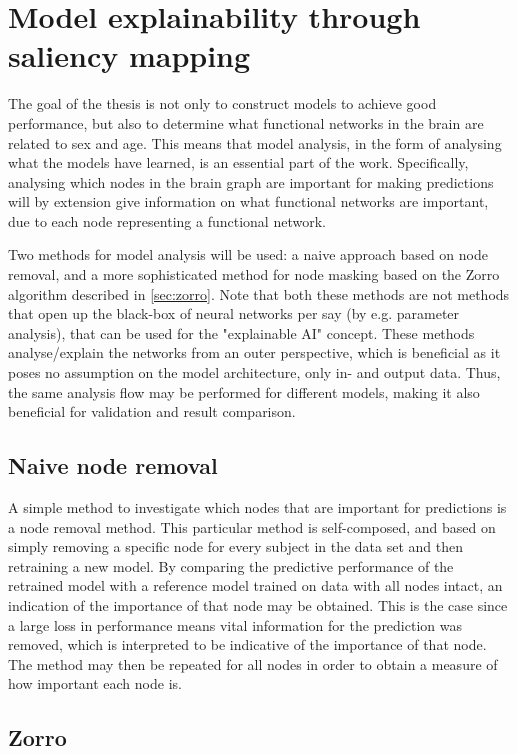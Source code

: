 \section{Model explainability through saliency mapping}
The goal of the thesis is not only to construct models to achieve good performance, but also to determine what functional networks in the brain are related to sex and age. This means that model analysis, in the form of analysing what the models have learned, is an essential part of the work. Specifically, analysing which nodes in the brain graph are important for making predictions will by extension give information on what functional networks are important, due to each node representing a functional network. 

Two methods for model analysis will be used: a naive approach based on node removal, and a more sophisticated method for node masking based on the Zorro algorithm described in \cref{sec:zorro}. Note that both these methods are not methods that open up the black-box of neural networks per say (by e.g. parameter analysis), that can be used for the "explainable AI" concept.  These methods analyse/explain the networks from an outer perspective, which is beneficial as it poses no assumption on the model architecture, only in- and output data. Thus, the same analysis flow may be performed for different models, making it also beneficial for validation and result comparison. 

\subsection{Naive node removal}
A simple method to investigate which nodes that are important for predictions is a node removal method. This particular method is self-composed, and based on simply removing a specific node for every subject in the data set and then retraining a new model. By comparing the predictive performance of the retrained model with a reference model trained on data with all nodes intact, an indication of the importance of that node may be obtained. This is the case since a large loss in performance means vital information for the prediction was removed, which is interpreted to be indicative of the importance of that node. The method may then be repeated for all nodes in order to obtain a measure of how important each node is.

\subsection{Zorro}

